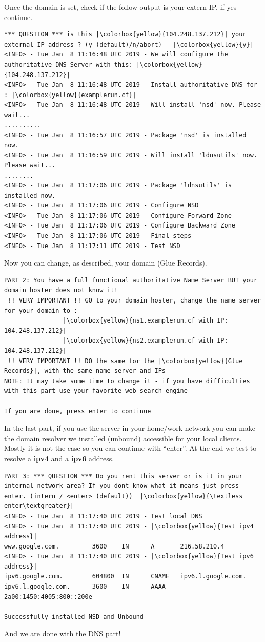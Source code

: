  Once the domain is set, check if the follow output is your extern IP, if yes continue.
\begin{lstlisting}[escapeinside=||]
 *** QUESTION *** is this |\colorbox{yellow}{104.248.137.212}| your external IP address ? (y (default)/n/abort)   |\colorbox{yellow}{y}|
<INFO> - Tue Jan  8 11:16:48 UTC 2019 - We will configure the authoritative DNS Server with this: |\colorbox{yellow}{104.248.137.212}|
<INFO> - Tue Jan  8 11:16:48 UTC 2019 - Install authoritative DNS for : |\colorbox{yellow}{examplerun.cf}|
<INFO> - Tue Jan  8 11:16:48 UTC 2019 - Will install 'nsd' now. Please wait...
..........
<INFO> - Tue Jan  8 11:16:57 UTC 2019 - Package 'nsd' is installed now.
<INFO> - Tue Jan  8 11:16:59 UTC 2019 - Will install 'ldnsutils' now. Please wait...
........
<INFO> - Tue Jan  8 11:17:06 UTC 2019 - Package 'ldnsutils' is installed now.
<INFO> - Tue Jan  8 11:17:06 UTC 2019 - Configure NSD
<INFO> - Tue Jan  8 11:17:06 UTC 2019 - Configure Forward Zone
<INFO> - Tue Jan  8 11:17:06 UTC 2019 - Configure Backward Zone
<INFO> - Tue Jan  8 11:17:06 UTC 2019 - Final steps
<INFO> - Tue Jan  8 11:17:11 UTC 2019 - Test NSD
\end{lstlisting}

Now you can change, as described, your domain (\gls{Glue Records}). 
\begin{lstlisting}[escapeinside=||]
PART 2: You have a full functional authoritative Name Server BUT your domain hoster does not know it!
 !! VERY IMPORTANT !! GO to your domain hoster, change the name server for your domain to :
                |\colorbox{yellow}{ns1.examplerun.cf with IP: 104.248.137.212}|
                |\colorbox{yellow}{ns2.examplerun.cf with IP: 104.248.137.212}|
 !! VERY IMPORTANT !! DO the same for the |\colorbox{yellow}{Glue Records}|, with the same name server and IPs
NOTE: It may take some time to change it - if you have difficulties with this part use your favorite web search engine

If you are done, press enter to continue
\end{lstlisting}

In the last part, if you use the server in your home/work network you can make the domain resolver we installed (unbound) accessible for your local clients. Mostly it is not the case so you can continue with ``enter''. At the end we test to resolve a \textbf{ipv4} and a  \textbf{ipv6} address. 
\begin{lstlisting}[escapeinside=||]
PART 3: *** QUESTION *** Do you rent this server or is it in your internal network area? If you dont know what it means just press enter. (intern / <enter> (default))  |\colorbox{yellow}{\textless enter\textgreater}|
<INFO> - Tue Jan  8 11:17:40 UTC 2019 - Test local DNS
<INFO> - Tue Jan  8 11:17:40 UTC 2019 - |\colorbox{yellow}{Test ipv4 address}|
www.google.com.         3600    IN      A       216.58.210.4
<INFO> - Tue Jan  8 11:17:40 UTC 2019 - |\colorbox{yellow}{Test ipv6 address}|
ipv6.google.com.        604800  IN      CNAME   ipv6.l.google.com.
ipv6.l.google.com.      3600    IN      AAAA    2a00:1450:4005:800::200e

Successfully installed NSD and Unbound
\end{lstlisting}
And we are done with the DNS part!
\newpage

